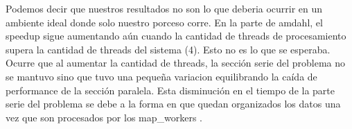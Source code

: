 Podemos decir que nuestros resultados no son lo que deberia ocurrir en un ambiente
ideal donde solo nuestro porceso corre.
En la parte de amdahl, el speedup sigue aumentando aún cuando la cantidad  de
threads de procesamiento supera la cantidad de threads del sistema (4). Esto no
es lo que se esperaba. Ocurre que al aumentar la cantidad de threads, la sección
serie del problema no se mantuvo sino que tuvo una pequeña variacion
equilibrando la caída de performance de la sección paralela. Esta disminución
en el tiempo de la parte serie del problema se debe a la forma en que quedan
organizados los datos una vez que son procesados por los map\_workers .